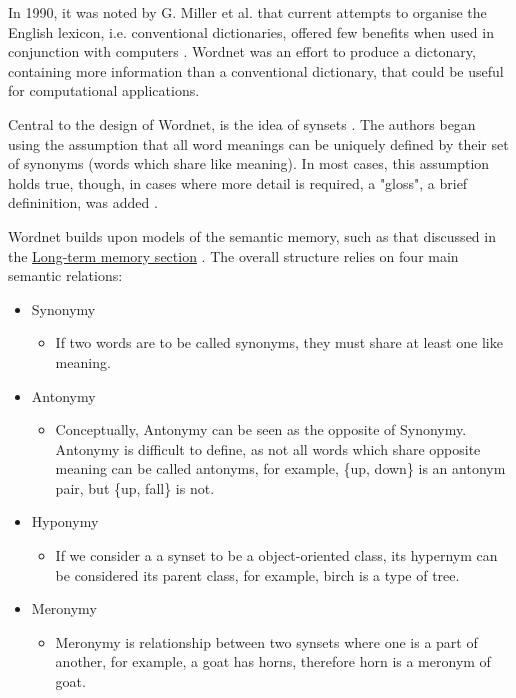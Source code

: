 \documentclass[]{article}
\begin{document}
In 1990, it was noted by G. Miller et al. that current attempts to organise the English lexicon, i.e. conventional dictionaries, offered few benefits when used in conjunction with computers \cite{WN1Introduction}. Wordnet was an effort to produce a dictonary, containing more information than a conventional dictionary, that could be useful for computational applications.

\label{Synsets}Central to the design of Wordnet, is the idea of synsets \cite{WN1Introduction}. The authors began using the assumption that all word meanings can be uniquely defined by their set of synonyms (words which share like meaning). In most cases, this assumption holds true, though, in cases where more detail is required, a "gloss", a brief defininition, was added \cite{WN1Introduction}.

Wordnet builds upon models of the semantic memory, such as that discussed in the \hyperref[LongTerm]{Long-term memory section} \cite{WN1Introduction}. The overall structure relies on four main semantic relations:

\begin{itemize}
	\item Synonymy
	\begin{itemize}
		\item If two words are to be called synonyms, they must share at least one like meaning.
	\end{itemize}
	
	\item Antonymy \label{Antonym}
	\begin{itemize}
		\item Conceptually, Antonymy can be seen as the opposite of Synonymy. Antonymy is difficult to define, as not all words which share opposite meaning can be called antonyms, for example, \{up, down\} is an antonym pair, but \{up, fall\} is not.
	\end{itemize}
	
	\item Hyponymy \label{Hypernym}
	\begin{itemize}
		\item If we consider a a synset to be a object-oriented class, its hypernym can be considered its parent class, for example, birch is a type of tree.
	\end{itemize}
	
	\item Meronymy \label{Meronym}
	\begin{itemize}
		\item Meronymy is relationship between two synsets where one is a part of another, for example, a goat has horns, therefore horn is a meronym of goat.
	\end{itemize}
	
\end{itemize}
\end{document}
